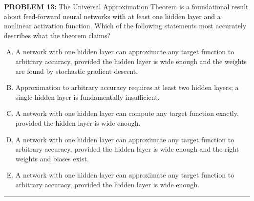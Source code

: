 \documentclass[12pt]{amsart}
\newcommand{\divider}{
  \vspace{-1em} %
  \noindent
  \raisebox{-0.15ex}{\textbullet}%
  \hspace{0.5em}%
  \rule[0.5ex]{0.95\textwidth}{1.0pt}%
  \hspace{0.5em}%
  \raisebox{-0.15ex}{\textbullet}%
  \vspace{0em} %
}
\begin{document}
{\bf PROBLEM 13:}
The Universal Approximation Theorem is a foundational result about feed-forward neural networks 
with at least one hidden layer and a nonlinear activation function.
Which of the following statements most accurately describes what the theorem claims?
\begin{enumerate}[(A)]
\item A network with one hidden layer can approximate any target function to arbitrary accuracy, 
provided the hidden layer is wide enough and the weights are found by stochastic gradient descent.
\item Approximation to arbitrary accuracy requires at least two hidden layers; a single hidden 
layer is fundamentally insufficient.
\item A network with one hidden layer can compute any target function exactly, provided the 
hidden layer is wide enough.
\item A network with one hidden layer can approximate any target function to arbitrary accuracy, 
provided the hidden layer is wide enough and the right weights and biases exist.
\item A network with one hidden layer can approximate any target function to arbitrary accuracy, 
provided the hidden layer is wide enough.
\end{enumerate}
%
%
\divider
\end{document}
